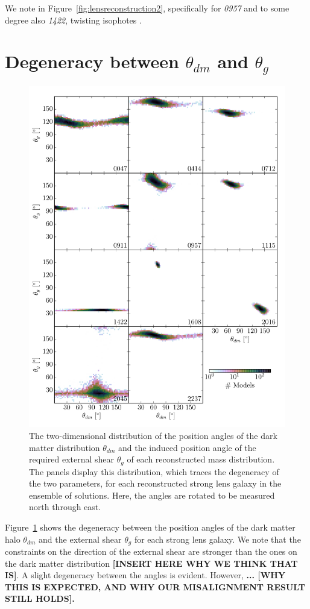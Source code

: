 \documentclass[useAMS,usenatbib]{mn2e}
\begin{document}
We note in Figure~\ref{fig:lensreconstruction2}, specifically for {\it0957} and to some degree also {\it1422}, twisting isophotes \citep[e.g.][]{1978ComAp...8...27B}.

\section{Degeneracy between $\theta_{dm}$ and $\theta_{g}$}\label{sec:shearshapedeg}
\begin{figure}
  \centering
  \includegraphics[width=.9\linewidth]{Figures/theta_scatter.pdf}
  \caption[width=\linewidth]{The two-dimensional distribution of the position angles of the dark matter distribution $\theta_{dm}$ and the induced position angle of the required external shear $\theta_{g}$ of each reconstructed mass distribution. The panels display this distribution, which traces the degeneracy of the two parameters, for each reconstructed strong lens galaxy in the ensemble of solutions. Here, the angles are rotated to be measured north through east.}
  \label{fig:thetascatter}
\end{figure}

Figure~\ref{fig:thetascatter} shows the degeneracy between the position angles of the dark matter halo $\theta_{dm}$ and the external shear $\theta_{g}$ for each strong lens galaxy. We note that the constraints on the direction of the external shear are stronger than the ones on the dark matter distribution \textbf{[INSERT HERE WHY WE THINK THAT IS]}. A slight degeneracy between the angles is evident. However, \textbf{... [WHY THIS IS EXPECTED, AND WHY OUR MISALIGNMENT RESULT STILL HOLDS].}
\end{document}
